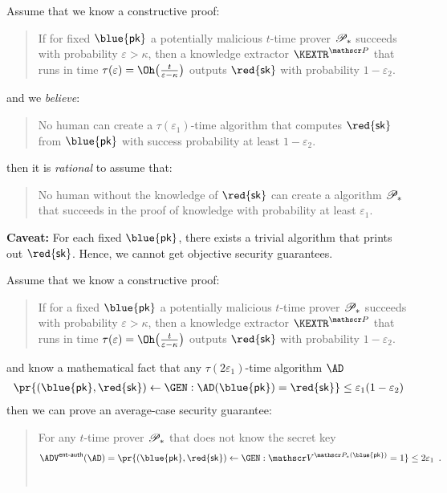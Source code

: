 \documentclass[landscape,footrule]{foils}
\renewcommand{\SK}{{\red{\mathsf{sk}}}}
\renewcommand{\PK}{{\blue{\mathsf{pk}}}}
\begin{document}


Assume that we know a constructive proof:\vspace*{-2ex}
\begin{quote}
  If for fixed $\PK$ a potentially malicious $t$-time prover
  $\mathscr{P}_*$ succeeds with probability $\varepsilon>\kappa$, then a
  knowledge extractor $\KEXTR^{\PROVER}$ that runs in time
  $\tau(\varepsilon)=\Oh\bigl(\frac{t}{\varepsilon-\kappa}\bigr)$
  outputs $\SK$ with probability $1-\varepsilon_2$.\vspace*{-2ex}
\end{quote}
and we \emph{believe}:\vspace*{-2ex}
\begin{quote}
  No human can create a $\tau(\varepsilon_1)$-time algorithm that
  computes $\SK$ from $\PK$ with success probability at least
  $1-\varepsilon_2$.\vspace*{-2ex}
\end{quote}
then it is \emph{rational} to assume that:\vspace*{-2ex} 
\begin{quote}
  No human without the knowledge of $\SK$ can create a algorithm
  $\mathscr{P}_*$ that succeeds in the proof of knowledge with probability
  at least $\varepsilon_1$.
\end{quote}

\textbf{Caveat:} For each fixed $\PK$, there exists a trivial
algorithm that prints out $\SK$. Hence, we cannot get objective
security guarantees.



Assume that we know a constructive proof:\vspace*{-2ex}
\begin{quote}
  If for a fixed $\PK$ a potentially malicious $t$-time prover
  $\mathscr{P}_*$ succeeds with probability $\varepsilon>\kappa$, then a
  knowledge extractor $\KEXTR^{\PROVER}$ that runs in time
  $\tau(\varepsilon)=\Oh\bigl(\frac{t}{\varepsilon-\kappa}\bigr)$
  outputs $\SK$ with probability $1-\varepsilon_2$.\vspace*{-2ex}
\end{quote}
and know a mathematical fact that  any $\tau(2\varepsilon_1)$-time algorithm $\AD$
\begin{align*}
\pr{(\PK,\SK)\gets\GEN:\AD(\PK)=\SK}\leq\varepsilon_1(1-\varepsilon_2)  
\end{align*}
then we can prove an average-case security guarantee:\vspace*{-2ex} 
\begin{quote}
  For any $t$-time prover $\mathscr{P}_*$ that does not know the secret key 
  \begin{align*}
    \advEAUTHXX{}{\AD}=\pr{(\PK,\SK)\gets\GEN:
      \VERIFIER^{\PROVER_*(\PK)}=1}\leq 2\varepsilon_1\enspace.
  \end{align*}\ \vspace*{-6ex}
\end{quote}
\end{document}
